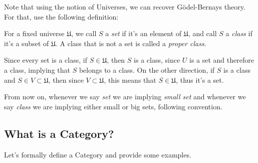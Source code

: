 Note that using the notion of Universes, we can recover Gödel-Bernays theory. For that,
use the following definition:
\begin{definition}
  For a fixed universe $\mathfrak U$, we call $S$ a \textit{set} if it's an element
  of $\mathfrak U$, and call $S$ a \textit{class} if it's a subset of $\mathfrak U$.
  A class that is not a set is called a \textit{proper class}.
\end{definition}
Since every set is a class, if $S \in \mathfrak U$, then $S$ is a class,
since $U$ is a set and therefore a class, implying that $S$ belongs to a class.
On the other direction, if $S$ is a class and $S \in V \subset \mathfrak U$,
then since $V \subset \mathfrak U$, this means that $S \in \mathfrak U$, thus
it's a set.

From now on, whenever we say \textit{set} we are implying \textit{small set}
and whenever we say \textit{class} we are implying either small or big sets,
following \citet{borceux1994handbook} convention.


\subsection{What is a Category?}

Let's formally define a Category and provide some examples.

